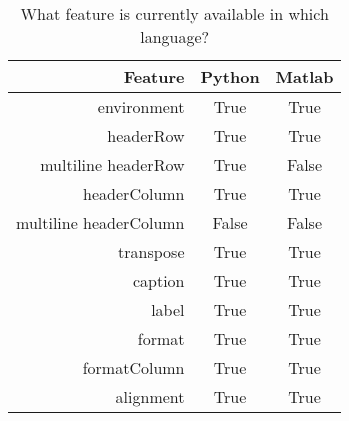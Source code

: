 \begin{table}[ht]
	\begin{center}
	\caption{What feature is currently available in which language?}
	\label{tab:features}
		\begin{tabular}{rcc}
		\toprule
			Feature & Python & Matlab\\
			\midrule
			environment & True & True\\
			headerRow & True & True\\
			multiline headerRow & True & False\\
			headerColumn & True & True\\
			multiline headerColumn & False & False\\
			transpose & True & True\\
			caption & True & True\\
			label & True & True\\
			format & True & True\\
			formatColumn & True & True\\
			alignment & True & True\\
		\bottomrule
		\end{tabular}
	\end{center}
\end{table}